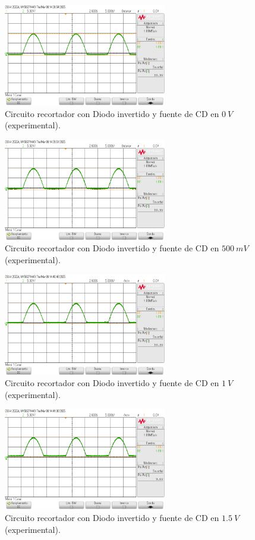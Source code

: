 \documentclass[journal]{IEEEtran}
\begin{document}
\begin{figure}[H]
        \centering
        \includegraphics[width=2.8in]{SignalExperimental_11.png}
        \caption{Circuito recortador con Diodo invertido y fuente de CD en $0~V$ (experimental).}
        \label{fig:SignalExperimental_11}
\end{figure}
\begin{figure}[H]
        \centering
        \includegraphics[width=2.8in]{SignalExperimental_12.png}
        \caption{Circuito recortador con Diodo invertido y fuente de CD en $500~mV$ (experimental).}
        \label{fig:SignalExperimental_12}
\end{figure}
\begin{figure}[H]
        \centering
        \includegraphics[width=2.8in]{SignalExperimental_13.png}
        \caption{Circuito recortador con Diodo invertido y fuente de CD en $1~V$ (experimental).}
        \label{fig:SignalExperimental_13}
\end{figure}
\begin{figure}[H]
        \centering
        \includegraphics[width=2.8in]{SignalExperimental_14.png}
        \caption{Circuito recortador con Diodo invertido y fuente de CD en $1.5~V$ (experimental).}
        \label{fig:SignalExperimental_14}
\end{figure}
\end{document}
